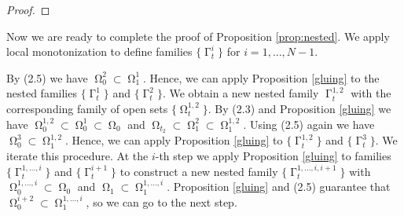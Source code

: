 \documentclass[12pt]{amsart}
\DeclareMathOperator{\Hn}{\mathcal{H}^n}
\DeclareMathOperator{\G}{\Gamma}
\DeclareMathOperator{\Om}{\Omega}
\DeclareMathOperator{\Si}{\Sigma}
\theoremstyle{definition}
\begin{document}
\begin{proof}





\end{proof}

Now we are ready to complete the proof of
Proposition \ref*{prop:nested}.
We apply local monotonization
to define families $\{\G^i_t\}$ for $i=1,...,N-1$.

By (2.5) we have $\Om_0^2 \subset \Om_1^1$.
Hence, we can apply  Proposition \ref*{gluing}
to the nested families $\{\G_t^1\}$ and $\{\G_t^2\}$.
We obtain a new nested family $\G_t^{1,2}$
with the corresponding family of open sets
$\{ \Om^{1,2}_t \}$. By (2.3) and Proposition \ref*{gluing}
we have $\Om^{1,2}_0 \subset \Om_0^1 \subset \Om_0$ and
$\Om_{t_2} \subset \Om^2_1 \subset \Om^{1,2}_1$.
Using (2.5) again we have
$\Om^3_0 \subset \Om^{1,2}_1$. Hence, we can apply Proposition
\ref*{gluing} to $\{ \G^{1,2}_t \}$ and $\{ \G^3_t \}$.
We iterate this procedure. At the $i$-th step we
apply Proposition \ref*{gluing} to families
$\{ \G^{1,...,i}_t \}$ and $\{ \G^{i+1}_t \}$ to construct a new
nested family $\{ \G^{1,...,i,i+1}_t \}$ with
$\Om^{1,...,i}_0 \subset \Om_0$ and 
$\Om_1 \subset \Om^{1,...,i}_1$. 
Proposition \ref*{gluing} and (2.5) guarantee that 
$\Om^{i+2}_0 \subset \Om^{1,...,i}_1$, so we can go 
to the next step.
\end{document}
